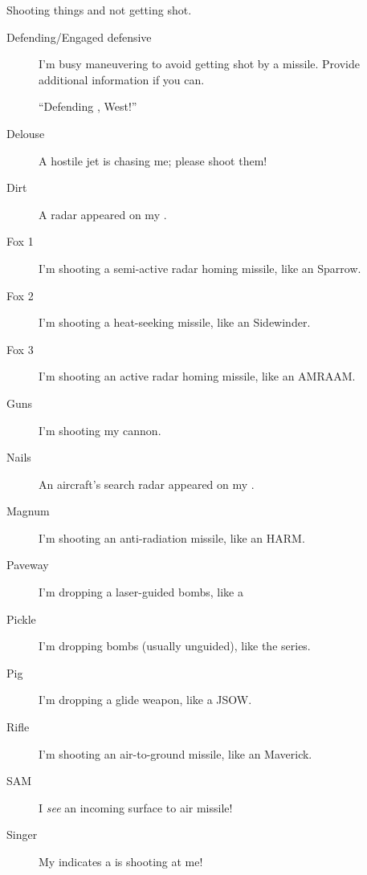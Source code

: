 Shooting things and not getting shot.
\begin{description}

\item[Defending/Engaged defensive] I'm busy maneuvering to avoid getting shot by
    a missile. Provide additional information if you can.

    ``Defending , West!''

\item[Delouse] A hostile jet is chasing me; please shoot them!

\item[Dirt] A  radar appeared on my .

\item[Fox 1] I'm shooting a semi-active radar homing 
    missile, like an  Sparrow.
\item[Fox 2] I'm shooting a heat-seeking missile, like an
     Sidewinder.
\item[Fox 3] I'm shooting an active radar homing  missile,
    like an  AMRAAM.

\item[Guns] I'm shooting my cannon.

\item[Nails] An aircraft's search radar appeared on my .

\item[Magnum] I'm shooting an anti-radiation missile,
    like an  HARM.

\item[Paveway] I'm dropping a laser-guided bombs,
    like a 

\item[Pickle] I'm dropping bombs (usually unguided),
    like the  series.

\item[Pig] I'm dropping a glide weapon, like a  JSOW.

\item[Rifle] I'm shooting an air-to-ground missile,
    like an  Maverick.

\item[SAM] I \emph{see} an incoming surface to air missile!

\item[Singer] My  indicates a  is shooting at me!


\end{description}
